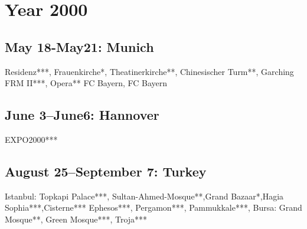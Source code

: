 \chapter{Year 2000}
\label{2000}

\section{May 18-May21: Munich}
\label{2000:Munich}

Residenz***, Frauenkirche*, Theatinerkirche**, Chinesischer Turm**, Garching FRM II***, Opera**
FC Bayern, FC Bayern

\section{June 3--June6: Hannover}
\label{2000:Hannover}

EXPO2000***

\section{August 25--September 7: Turkey}
\label{2000:Turkey}


Istanbul: Topkapi Palace***, Sultan-Ahmed-Mosque**,Grand Bazaar*,Hagia Sophia***,Cisterne***
Ephesos***, Pergamon***, Pammukkale***, Bursa: Grand Mosque**, Green Mosque***, Troja***